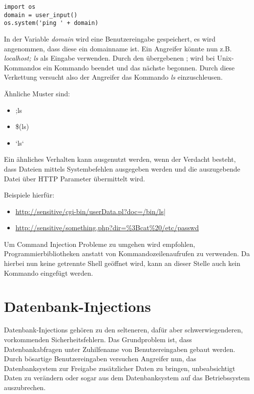 \begin{verbatim}
import os
domain = user_input()
os.system('ping ' + domain)
\end{verbatim}

In der Variable \textit{domain} wird eine Benutzereingabe gespeichert, es wird angenommen, dass diese ein domainname ist. Ein Angreifer könnte nun z.B. \textit{localhost; ls} als Eingabe verwenden. Durch den übergebenen ; wird bei Unix-Kommandos ein Kommando beendet und das nächste begonnen. Durch diese Verkettung versucht also der Angreifer das Kommando \textit{ls} einzuschleusen.

Ähnliche Muster sind:

\begin{itemize}
\item ;ls
\item \$(ls)
\item `ls`
\end{itemize}

Ein ähnliches Verhalten kann ausgenutzt werden, wenn der Verdacht besteht, dass Dateien mittels Systembefehlen ausgegeben werden und die auszugebende Datei über HTTP Parameter übermittelt wird.

Beispiele hierfür:

\begin{itemize}
\item \url{http://sensitive/cgi-bin/userData.pl?doc=/bin/ls|}
\item \url{http://sensitive/something.php?dir=\%3Bcat\%20/etc/passwd}
\end{itemize}

Um Command Injection Probleme zu umgehen wird empfohlen, Programmierbibliotheken anstatt von Kommandozeilenaufrufen zu verwenden. Da hierbei nun keine getrennte Shell geöffnet wird, kann an dieser Stelle auch kein Kommando eingefügt werden.

\section{Datenbank-Injections}

Datenbank-Injections gehören zu den selteneren, dafür aber schwerwiegenderen, vorkommenden Sicherheitsfehlern. Das Grundproblem ist, dass Datenbankabfragen unter Zuhilfename von Benutzereingaben gebaut werden. Durch bösartige Benutzereingaben versuchen Angreifer nun, das Datenbanksystem zur Freigabe zusätzlicher Daten zu bringen, unbeabsichtigt Daten zu verändern oder sogar aus dem Datenbanksystem auf das Betriebssystem auszubrechen.

